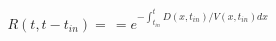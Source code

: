 \begin{equation}
R(t,t-t_{in}) = \frac{}{} = e^{-\int_{t_{in}}^t D(x,t_{in})/V(x,t_{in}) dx}
\end{equation}